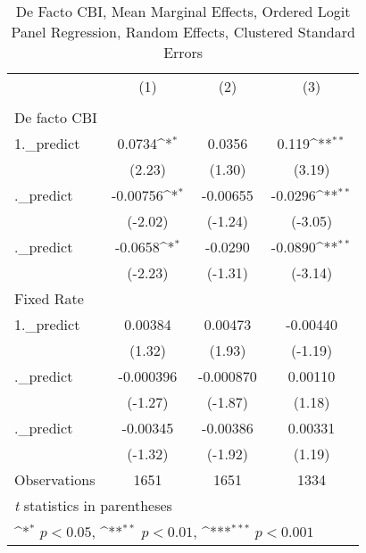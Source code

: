 \begin{table}[htbp]\centering
\def\sym#1{\ifmmode^{#1}\else\(^{#1}\)\fi}
\caption{De Facto CBI, Mean Marginal Effects, Ordered Logit Panel Regression, Random Effects, Clustered Standard Errors \label{ordLogDF}}
\begin{tabular}{l*{3}{c}}
\toprule
                                        &\multicolumn{1}{c}{(1)}&\multicolumn{1}{c}{(2)}&\multicolumn{1}{c}{(3)}\\
                                        &\multicolumn{1}{c}{}&\multicolumn{1}{c}{}&\multicolumn{1}{c}{}\\
\midrule
De facto CBI                            &                  &                  &                  \\
1.\_predict                              &   0.0734\sym{*}  &   0.0356         &    0.119\sym{**} \\
                                        &   (2.23)         &   (1.30)         &   (3.19)         \\
\addlinespace
2.\_predict                              & -0.00756\sym{*}  & -0.00655         &  -0.0296\sym{**} \\
                                        &  (-2.02)         &  (-1.24)         &  (-3.05)         \\
\addlinespace
3.\_predict                              &  -0.0658\sym{*}  &  -0.0290         &  -0.0890\sym{**} \\
                                        &  (-2.23)         &  (-1.31)         &  (-3.14)         \\
\midrule
Fixed Rate                              &                  &                  &                  \\
1.\_predict                              &  0.00384         &  0.00473         & -0.00440         \\
                                        &   (1.32)         &   (1.93)         &  (-1.19)         \\
\addlinespace
2.\_predict                              &-0.000396         &-0.000870         &  0.00110         \\
                                        &  (-1.27)         &  (-1.87)         &   (1.18)         \\
\addlinespace
3.\_predict                              & -0.00345         & -0.00386         &  0.00331         \\
                                        &  (-1.32)         &  (-1.92)         &   (1.19)         \\
\midrule
Observations                            &     1651         &     1651         &     1334         \\
\bottomrule
\multicolumn{4}{l}{\footnotesize \textit{t} statistics in parentheses}\\
\multicolumn{4}{l}{\footnotesize \sym{*} \(p<0.05\), \sym{**} \(p<0.01\), \sym{***} \(p<0.001\)}\\
\end{tabular}
\end{table}
